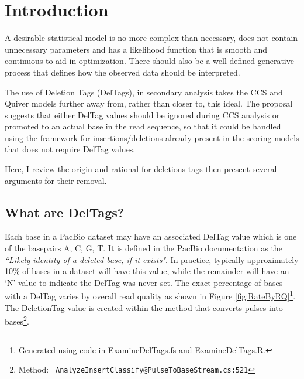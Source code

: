 \documentclass[fleqn,10pt]{SelfArx} %
\begin{document}
\flushbottom %

\maketitle %

\tableofcontents %

\thispagestyle{empty} %


\section*{Introduction} %


A desirable statistical model is no more complex than necessary, does not contain unnecessary parameters and has a likelihood function that is smooth and continuous to aid in optimization.  There should also be a well defined generative process that defines how the observed data should be interpreted.

The use of Deletion Tags (DelTags), in secondary analysis takes the CCS and Quiver models further away from, rather than closer to, this ideal.  The proposal suggests that either DelTag values should be ignored during CCS analysis or promoted to an actual base in the read sequence, so that it could be handled using the framework for insertions/deletions already present in the scoring models that does not require DelTag values. 

Here, I review the origin and rational for deletions tags then present several arguments for their removal. 



\subsection{What are DelTags?}
Each base in a PacBio dataset may have an associated DelTag value which is one of the basepairs A, C, G, T.  It is defined in the PacBio documentation as the \textit{``Likely identity of a deleted base, if it exists"}.  In practice, typically approximately 10\% of bases in a dataset will have this value, while the remainder will have an `N' value to indicate the DelTag was never set.  The exact percentage of bases with a DelTag varies by overall read quality as shown in Figure \ref{fig:RateByRQ}\footnote{Generated using code in ExamineDelTags.fs and ExamineDelTags.R.}.  The DeletionTag value is created within the method that converts pulses into bases\footnote{Method: \texttt{ AnalyzeInsertClassify@PulseToBaseStream.cs:521}}.
\end{document}
